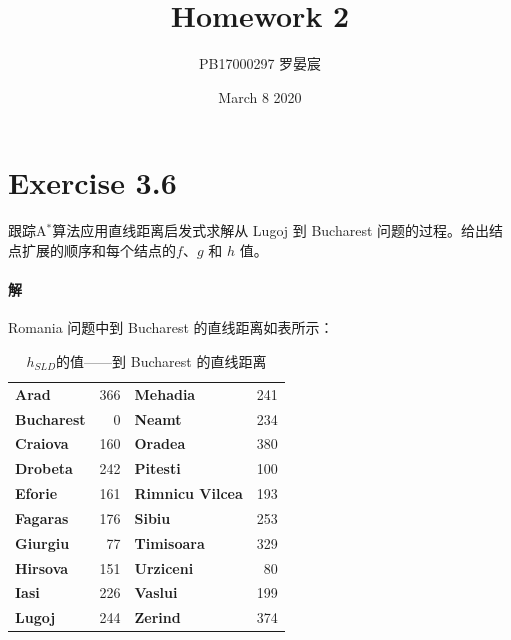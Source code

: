 \documentclass{article}
\title{Homework 2}
\author{PB17000297 罗晏宸}
\date{March 8 2020}
\begin{document}
\maketitle

\section{Exercise 3.6}
跟踪A$^*$算法应用直线距离启发式求解从 Lugoj 到 Bucharest 问题的过程。给出结点扩展的顺序和每个结点的$f$、$g$ 和 $h$ 值。

\paragraph{解}
Romania 问题中到 Bucharest 的直线距离如表所示：
\begin{table}[h]
    \centering
    \begin{tabular}{lrlr}
    \textbf{Arad}      & 366 & \textbf{Mehadia}        & 241 \\
    \textbf{Bucharest} & 0   & \textbf{Neamt}          & 234 \\
    \textbf{Craiova}   & 160 & \textbf{Oradea}         & 380 \\
    \textbf{Drobeta}   & 242 & \textbf{Pitesti}        & 100 \\
    \textbf{Eforie}    & 161 & \textbf{Rimnicu Vilcea} & 193 \\
    \textbf{Fagaras}   & 176 & \textbf{Sibiu}          & 253 \\
    \textbf{Giurgiu}   & 77  & \textbf{Timisoara}      & 329 \\
    \textbf{Hirsova}   & 151 & \textbf{Urziceni}       & 80  \\
    \textbf{Iasi}      & 226 & \textbf{Vaslui}         & 199 \\
    \textbf{Lugoj}     & 244 & \textbf{Zerind}         & 374
    \end{tabular}
    \caption{$h_{SLD}$的值——到 Bucharest 的直线距离}
\end{table}
\end{document}
